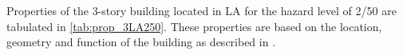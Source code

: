 \documentclass[onecolumn, fleqn]{article}
\newcommand{\ft}{\ensuremath{\,\mathrm{ft}}}
\newcommand{\m}{\ensuremath{\,\mathrm{m}}}
\begin{document}

Properties of the 3-story building located in LA for the hazard level of 2/50 are tabulated in \cref{tab:prop_3LA250}. These properties are based on the location, geometry and function of the building as described in \citet{FEMA335c2000}.
\end{document}

